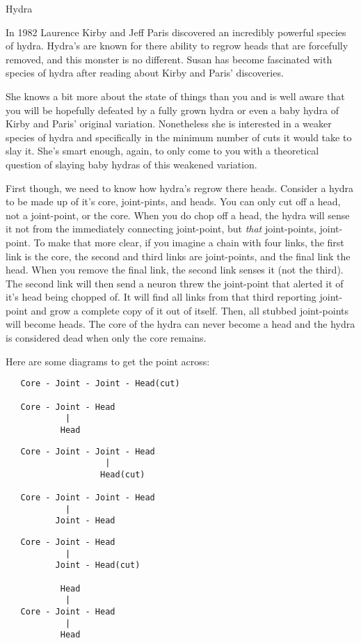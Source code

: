 \begin{problem}{Hydra}
\end{problem}
In 1982 Laurence Kirby and Jeff Paris discovered an incredibly powerful species of hydra.
Hydra's are known for there ability to regrow heads that are forcefully removed, and this monster is no different.
Susan has become fascinated with species of hydra after reading about Kirby and Paris' discoveries.

She knows a bit more about the state of things than you and is well aware that you will be hopefully defeated by a fully grown hydra or even a baby hydra of Kirby and Paris' original variation.
Nonetheless she is interested in a weaker species of hydra and specifically in the minimum number of cuts it would take to slay it.
She's smart enough, again, to only come to you with a theoretical question of slaying baby hydras of this weakened variation.

First though, we need to know how hydra's regrow there heads.
Consider a hydra to be made up of it's core, joint-pints, and heads.
You can only cut off a head, not a joint-point, or the core.
When you do chop off a head, the hydra will sense it not from the immediately connecting joint-point, but \textit{that} joint-points, joint-point.
To make that more clear, if you imagine a chain with four links, the first link is the core, the second and third links are joint-points, and the final link the head.
When you remove the final link, the second link senses it (not the third).
The second link will then send a neuron threw the joint-point that alerted it of it's head being chopped of.
It will find all links from that third reporting joint-point and grow a complete copy of it out of itself.
Then, all stubbed joint-points will become heads.
The core of the hydra can never become a head and the hydra is considered dead when only the core remains.

Here are some diagrams to get the point across:

\begin{verbatim}
   Core - Joint - Joint - Head(cut)

   Core - Joint - Head
            |
           Head
\end{verbatim}
\begin{verbatim}
   Core - Joint - Joint - Head
                    |
                   Head(cut)

   Core - Joint - Joint - Head
            |
          Joint - Head
\end{verbatim}
\begin{verbatim}
   Core - Joint - Head
            |
          Joint - Head(cut)

           Head
            |
   Core - Joint - Head
            |
           Head
\end{verbatim}

